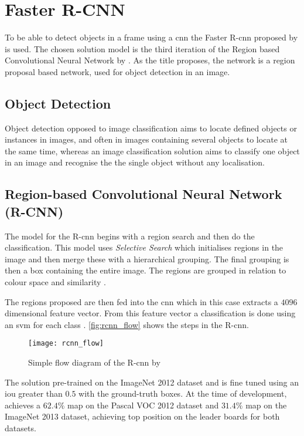 \section{Faster R-CNN}
To be able to detect objects in a frame using a \gls{cnn} the Faster R-\gls{cnn} proposed by \cite{Ren2017} is used. The chosen solution model is the third iteration of the Region based Convolutional Neural Network by \cite{Girshick2014}. As the title proposes, the network is a region proposal based network, used for object detection in an image.

\subsection{Object Detection}
Object detection opposed to image classification aims to locate defined objects or instances in images, and often in images containing several objects to locate at the same time, whereas an image classification solution aims to classify one object in an image and recognise the the single object without any localisation.

\subsection{Region-based Convolutional Neural Network (R-CNN)} 
The model for the R-\gls{cnn} begins with a region search and then do the classification. This model uses \textit{Selective Search} which initialises regions in the image and then merge these with a hierarchical grouping. The final grouping is then a box containing the entire image. The regions are grouped in relation to colour space and similarity \citep{Girshick2014}.

The regions proposed are then fed into the \gls{cnn} which in this case extracts a $4096$ dimensional feature vector. From this feature vector a classification is done using an \gls{svm} for each class \citep{Girshick2014}. \autoref{fig:rcnn_flow} shows the steps in the R-\gls{cnn}.

\begin{figure}[H]
	\centering
	\texttt{[image: rcnn\_flow]}
	\caption{Simple flow diagram of the R-\gls{cnn} by \cite{Girshick2014}}
	\label{fig:rcnn_flow}
\end{figure}

The solution pre-trained on the ImageNet 2012 dataset and is fine tuned using an \gls{iou} greater than $0.5$ with the ground-truth boxes. At the time of development, \cite{Girshick2014} achieves a $62.4\%$ \gls{map} on the Pascal VOC 2012 dataset and $31.4\%$ \gls{map} on the ImageNet 2013 dataset, achieving top position on the leader boards for both datasets.


